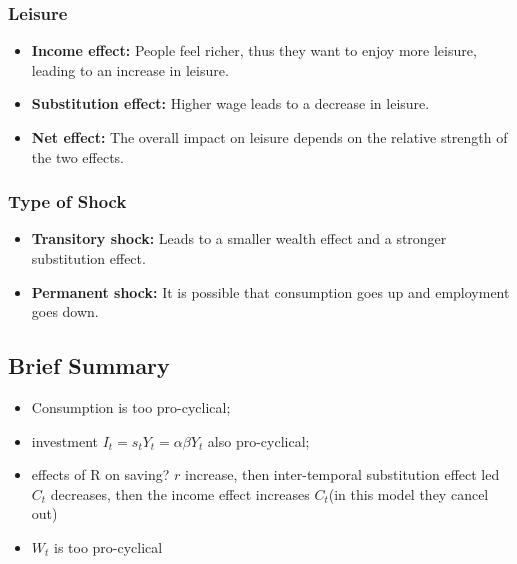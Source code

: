 \subsubsection{Leisure}
\begin{itemize}
  \item \textbf{Income effect:} People feel richer, thus they want to enjoy more leisure, leading to an increase in leisure.
  \item \textbf{Substitution effect:} Higher wage leads to a decrease in leisure.
  \item \textbf{Net effect:} The overall impact on leisure depends on the relative strength of the two effects.
\end{itemize}

\subsubsection{Type of Shock}
\begin{itemize}
  \item \textbf{Transitory shock:} Leads to a smaller wealth effect and a stronger substitution effect.
  \item \textbf{Permanent shock:} It is possible that consumption goes up and employment goes down.
\end{itemize}

\subsection{Brief Summary}
\begin{itemize}
  \item Consumption is too pro-cyclical;
  \item investment $I_t = s_t Y_t = \alpha \beta Y_t$ also pro-cyclical;
  \item effects of R on saving?
  $r$ increase, then inter-temporal substitution effect led $C_t$ decreases, 
  then the income effect increases $C_t$(in this model they cancel out)
  \item $W_t$ is too pro-cyclical
\end{itemize}